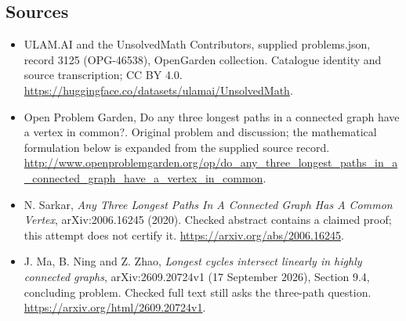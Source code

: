 \documentclass[11pt,a4paper]{article}
\begin{document}
\subsection{Sources}
\begin{itemize}
\item[S1] ULAM.AI and the UnsolvedMath Contributors, supplied problems.json, record 3125 (OPG-46538), OpenGarden collection. Catalogue identity and source transcription; CC BY 4.0.
\url{https://huggingface.co/datasets/ulamai/UnsolvedMath}.
\item[S2] Open Problem Garden, Do any three longest paths in a connected graph have a vertex in common?. Original problem and discussion; the mathematical formulation below is expanded from the supplied source record.
\url{http://www.openproblemgarden.org/op/do_any_three_longest_paths_in_a_connected_graph_have_a_vertex_in_common}.
\item[R1] N. Sarkar, \emph{Any Three Longest Paths In A Connected Graph Has A Common Vertex}, arXiv:2006.16245 (2020). Checked abstract contains a claimed proof; this attempt does not certify it.
\url{https://arxiv.org/abs/2006.16245}.
\item[R2] J. Ma, B. Ning and Z. Zhao, \emph{Longest cycles intersect linearly in highly connected graphs}, arXiv:2609.20724v1 (17 September 2026), Section 9.4, concluding problem. Checked full text still asks the three-path question.
\url{https://arxiv.org/html/2609.20724v1}.
\end{itemize}
\end{document}
